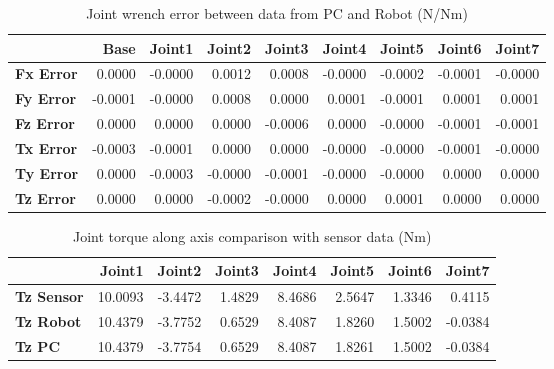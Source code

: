 \begin{table}[h!]
	\centering
	\caption{Joint wrench error between data from PC and Robot (N/Nm)}
	\label{wrech_Error_Pose1}
	\begin{tabular}{|l|r|r|r|r|r|r|r|r|}
		\hline
		\textbf{}  & \textbf{Base} & \textbf{Joint1}  & \textbf{Joint2}  & \textbf{Joint3}  & \textbf{Joint4}  & \textbf{Joint5}  & \textbf{Joint6}  & \textbf{Joint7} \\ \hline
		\textbf{Fx Error}  & 0.0000        & -0.0000        & 0.0012        & 0.0008        & -0.0000        & -0.0002        & -0.0001        & -0.0000 \\ \hline
		\textbf{Fy Error}  & -0.0001        & -0.0000        & 0.0008        & 0.0000        & 0.0001        & -0.0001        & 0.0001        & 0.0001 \\ \hline
		\textbf{Fz Error}  & 0.0000        & 0.0000        & 0.0000        & -0.0006        & 0.0000        & -0.0000        & -0.0001        & -0.0001 \\ \hline
		\textbf{Tx Error}  & -0.0003        & -0.0001        & 0.0000        & 0.0000        & -0.0000        & -0.0000        & -0.0001        & -0.0000 \\ \hline
		\textbf{Ty Error}  & 0.0000        & -0.0003        & -0.0000        & -0.0001        & -0.0000        & -0.0000        & 0.0000        & 0.0000 \\ \hline
		\textbf{Tz Error}  & 0.0000        & 0.0000        & -0.0002        & -0.0000        & 0.0000        & 0.0001        & 0.0000        & 0.0000 \\ \hline
	\end{tabular}
\end{table}

\begin{table}[h!]
	\centering
	\caption{Joint torque along axis comparison with sensor data (Nm)}
	\label{wrech_Sensor_Pose1}
	\begin{tabular}{|l|r|r|r|r|r|r|r|}
		\hline
		\textbf{} & \textbf{Joint1} & \textbf{Joint2} & \textbf{Joint3} & \textbf{Joint4} & \textbf{Joint5} & \textbf{Joint6} & \textbf{Joint7} \\ \hline
		\textbf{Tz Sensor}  & 10.0093           & -3.4472           & 1.4829            & 8.4686           & 2.5647           & 1.3346           & 0.4115           \\ \hline
		\textbf{Tz Robot}  	& 10.4379           & -3.7752           & 0.6529            & 8.4087           & 1.8260           & 1.5002           & -0.0384           \\ \hline
		\textbf{Tz PC}  	& 10.4379           & -3.7754           & 0.6529            & 8.4087           & 1.8261           & 1.5002           & -0.0384           \\ \hline
	\end{tabular}
\end{table}

